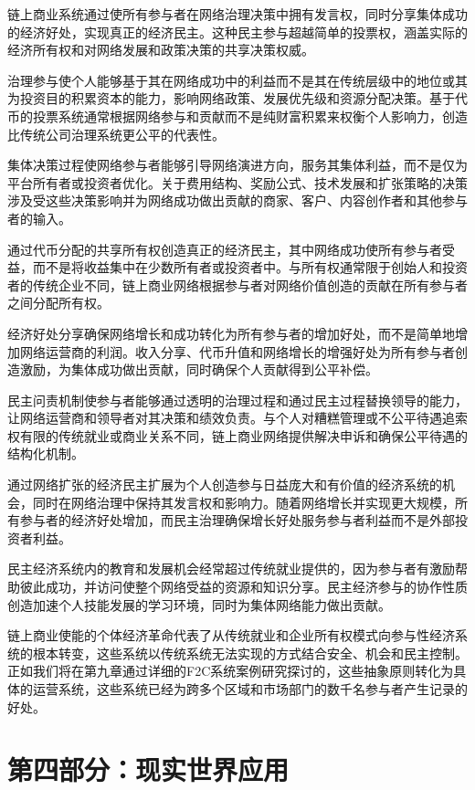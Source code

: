 \documentclass[
  Letterpaper,
]{scrbook}
\begin{document}
链上商业系统通过使所有参与者在网络治理决策中拥有发言权，同时分享集体成功的经济好处，实现真正的经济民主。这种民主参与超越简单的投票权，涵盖实际的经济所有权和对网络发展和政策决策的共享决策权威。

治理参与使个人能够基于其在网络成功中的利益而不是其在传统层级中的地位或其为投资目的积累资本的能力，影响网络政策、发展优先级和资源分配决策。基于代币的投票系统通常根据网络参与和贡献而不是纯财富积累来权衡个人影响力，创造比传统公司治理系统更公平的代表性。

集体决策过程使网络参与者能够引导网络演进方向，服务其集体利益，而不是仅为平台所有者或投资者优化。关于费用结构、奖励公式、技术发展和扩张策略的决策涉及受这些决策影响并为网络成功做出贡献的商家、客户、内容创作者和其他参与者的输入。

通过代币分配的共享所有权创造真正的经济民主，其中网络成功使所有参与者受益，而不是将收益集中在少数所有者或投资者中。与所有权通常限于创始人和投资者的传统企业不同，链上商业网络根据参与者对网络价值创造的贡献在所有参与者之间分配所有权。

经济好处分享确保网络增长和成功转化为所有参与者的增加好处，而不是简单地增加网络运营商的利润。收入分享、代币升值和网络增长的增强好处为所有参与者创造激励，为集体成功做出贡献，同时确保个人贡献得到公平补偿。

民主问责机制使参与者能够通过透明的治理过程和通过民主过程替换领导的能力，让网络运营商和领导者对其决策和绩效负责。与个人对糟糕管理或不公平待遇追索权有限的传统就业或商业关系不同，链上商业网络提供解决申诉和确保公平待遇的结构化机制。

通过网络扩张的经济民主扩展为个人创造参与日益庞大和有价值的经济系统的机会，同时在网络治理中保持其发言权和影响力。随着网络增长并实现更大规模，所有参与者的经济好处增加，而民主治理确保增长好处服务参与者利益而不是外部投资者利益。

民主经济系统内的教育和发展机会经常超过传统就业提供的，因为参与者有激励帮助彼此成功，并访问使整个网络受益的资源和知识分享。民主经济参与的协作性质创造加速个人技能发展的学习环境，同时为集体网络能力做出贡献。

链上商业使能的个体经济革命代表了从传统就业和企业所有权模式向参与性经济系统的根本转变，这些系统以传统系统无法实现的方式结合安全、机会和民主控制。正如我们将在第九章通过详细的F2C系统案例研究探讨的，这些抽象原则转化为具体的运营系统，这些系统已经为跨多个区域和市场部门的数千名参与者产生记录的好处。

\part{第四部分：现实世界应用}
\end{document}
